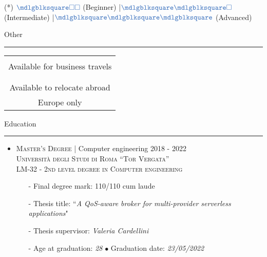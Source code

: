 \documentclass[english,10pt,a4paper]{article}
\newcommand{\CompanyName}[1]{\textsc{{\small #1}}}
\newcommand{\JobTimeRange}[1]{{\scriptsize \textcolor{CvColor!50}{\faCalendar*} \hspace{0.01cm} \textcolor{CvIcon}{#1}}}
\newcommand{\CvBullet}{\hspace{0.05cm} \textcolor{CvColor}{$\bullet$} \hspace{0.05cm}}
\newcommand{\CvSection}[2]{
	\hspace{0.25cm}\textcolor{CvColor!50}{#1} \hspace{0.01cm} \textcolor{CvColor!80}{#2}\\
	\textcolor{CvColor}{\rule[.7\baselineskip]{\textwidth}{1pt}}}
\newcommand{\CvSidebarSection}[2]{
	\textcolor{CvColor!50}{{\footnotesize #1}} \hspace{0.01cm} \textcolor{CvColor!80}{{\footnotesize #2}} \\
	\textcolor{CvColor}{\rule[.7\baselineskip]{0.8\textwidth}{1pt}}}
\newcommand{\FullBlock}{\textcolor{CvColor}{\mdlgblksquare}}
\newcommand{\EmptyBlock}{\textcolor{CvColor}{\square}}
\newcommand{\Sep}{\textcolor{CvColor}{|}\hspace{0.1cm}}
\begin{document}
\begin{paracol}{2}
\begin{tcolorbox}[colback=CvSidebarBackColor,height=\textheight,boxrule=1pt, left=0pt,right=1pt,top=0pt,bottom=0pt, arc=0pt,outer arc=0pt, colframe=CvSidebarBackColor]
\begin{center}
	{\tiny \textcolor{CvColor}{(*)} \hspace{0.05cm} $\FullBlock\EmptyBlock\EmptyBlock$ (Beginner) \Sep $\FullBlock\FullBlock\EmptyBlock$ (Intermediate) \Sep $\FullBlock\FullBlock\FullBlock$ (Advanced)}

\vspace{0.5cm}	

\CvSidebarSection{\faTags}{Other}

{\scriptsize \begin{tabular}{c}
	\textcolor{CvColor}{\faPlaneDeparture} \\
	Available for business travels \\\\
	
	\textcolor{CvColor}{\faGlobeEurope} \\ 
	Available to relocate abroad \\
	\worldflag[length=0.5cm, width=0.30cm]{EU} \textcolor{CvColor}{Europe only}
\end{tabular}}


\end{center}
	

	
\end{tcolorbox}
\switchcolumn  %
\begin{tcolorbox}[colback=white, height=\textheight, colframe=white, left=0cm]
		
\vspace{0.3cm}	
\CvSection{\faGraduationCap}{Education}
\begin{itemize}
	\item \CompanyName{Master’s Degree} \textcolor{CvColor}{|} {\scriptsize Computer engineering} \hfill \JobTimeRange{2018 - 2022}\\
	{\scriptsize \textcolor{CvIcon}{\textsc{Università degli Studi di Roma ``Tor Vergata''}}} \\
	{\scriptsize \textcolor{CvIcon}{\textsc{LM-32 - 2nd level degree in Computer engineering}}}
	{\scriptsize \begin{itemize}
			\item[-] Final degree mark: \textcolor{CvColor}{110/110 cum laude}
			\item[-] Thesis title: ``\textit{A QoS-aware broker for multi-provider serverless applications}"
			\item[-] Thesis supervisor: \textit{Valeria Cardellini}
			\item[-] Age at graduation: \textit{28} \CvBullet Graduation date: \textit{23/05/2022}	
	\end{itemize}}
	

\end{itemize}
\end{tcolorbox}
\end{paracol}
\end{document}
